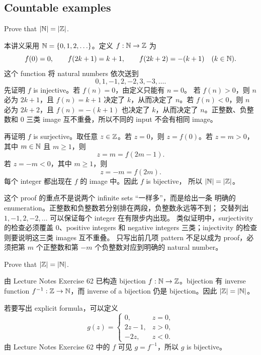 \subsection{Countable examples}

\begin{exerciseblock}
Prove that \(\left|\mathbb{N}\right|=\left|\mathbb{Z}\right|\).
\end{exerciseblock}

\begin{solution}
本讲义采用 \(\mathbb{N}=\{0,1,2,\ldots\}\)。定义 \(f:\mathbb{N}\to\mathbb{Z}\) 为
\[
  f(0)=0,\qquad
  f(2k+1)=k+1,\qquad
  f(2k+2)=-(k+1)
  \quad (k\in\mathbb{N}).
\]
这个 function 将 natural numbers 依次送到
\[
  0,1,-1,2,-2,3,-3,\ldots .
\]
先证明 \(f\) is injective。若 \(f(n)=0\)，由定义只能有 \(n=0\)。
若 \(f(n)>0\)，则 \(n\) 必为 \(2k+1\)，且 \(f(n)=k+1\) 决定了
\(k\)，从而决定了 \(n\)。若 \(f(n)<0\)，则 \(n\) 必为 \(2k+2\)，且
\(f(n)=-(k+1)\) 也决定了 \(k\)，从而决定了 \(n\)。正整数、负整数和
\(0\) 三类 image 互不重叠，所以不同的 input 不会有相同 image。

再证明 \(f\) is surjective。取任意 \(z\in\mathbb{Z}\)。若 \(z=0\)，则
\(z=f(0)\)。若 \(z=m>0\)，其中 \(m\in\mathbb{N}\) 且 \(m\ge 1\)，则
\[
  z=m=f(2m-1).
\]
若 \(z=-m<0\)，其中 \(m\ge 1\)，则
\[
  z=-m=f(2m).
\]
每个 integer 都出现在 \(f\) 的 image 中。因此 \(f\) is bijective，
所以 \(\left|\mathbb{N}\right|=\left|\mathbb{Z}\right|\)。
\end{solution}

\begin{explanation}
这个 proof 的重点不是说两个 infinite sets ``一样多''，而是给出一条
明确的 enumeration。正整数和负整数若分别排在两段，负整数永远等不到；
交替列出 \(1,-1,2,-2,\ldots\) 可以保证每个 integer 在有限步内出现。
类似证明中，surjectivity 的检查必须覆盖 \(0\)、positive integers 和
negative integers 三类；injectivity 的检查则要说明这三类 images 互不重叠。
只写出前几项 pattern 不足以成为 proof，必须把第 \(m\) 个正整数和第
\(-m\) 个负整数对应到明确的 natural number。
\end{explanation}

\begin{exerciseblock}
Prove that \(\left|\mathbb{Z}\right|=\left|\mathbb{N}\right|\).
\end{exerciseblock}

\begin{solution}
由 Lecture Notes Exercise 62 已构造 bijection \(f:\mathbb{N}\to\mathbb{Z}\)。bijection
有 inverse function \(f^{-1}:\mathbb{Z}\to\mathbb{N}\)，而 inverse of a bijection 仍是
bijection。因此 \(\left|\mathbb{Z}\right|=\left|\mathbb{N}\right|\)。

若要写出 explicit formula，可以定义
\[
  g(z)=
  \begin{cases}
    0,&z=0,\\
    2z-1,&z>0,\\
    -2z,&z<0.
  \end{cases}
\]
由 Lecture Notes Exercise 62 中的 \(f\) 可见 \(g=f^{-1}\)，所以
\(g\) is bijective。
\end{solution}

